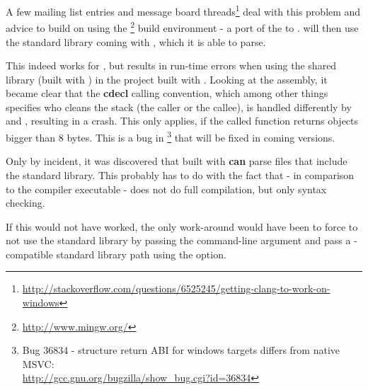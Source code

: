 A few mailing list entries and message board threads\footnote{\url{http://stackoverflow.com/questions/6525245/getting-clang-to-work-on-windows}} deal with this problem and advice to build  on  using the \footnote{\url{http://www.mingw.org/}} build environment - a port of the  to .  will then use the standard library coming with , which it is able to parse.

This indeed works for , but results in run-time errors when using the  shared library (built with ) in the  project built with . Looking at the assembly, it became clear that the \textbf{cdecl} calling convention, which among other things specifies who cleans the stack (the caller or the callee), is handled differently by  and , resulting in a crash. This only applies, if the called function returns objects bigger than 8 bytes. This is a bug in \footnote{Bug 36834 - structure return ABI for windows targets differs from native MSVC:\\ \url{http://gcc.gnu.org/bugzilla/show_bug.cgi?id=36834}} that will be fixed in coming versions.

Only by incident, it was discovered that  built with  \textbf{can} parse files that include the   standard library. This probably has to do with the fact that  - in comparison to the  compiler executable - does not do full compilation, but only syntax checking.

If this would not have worked, the only work-around would have been to force  to not use the standard library by passing the  command-line argument and pass a -compatible standard library path using the  option.
